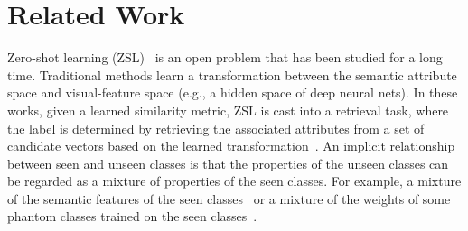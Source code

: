 \documentclass[letterpaper]{article} %
\begin{document}
\section{Related Work}
Zero-shot learning (ZSL)~\cite{Larochelle:2008:ZLN:1620163.1620172,lampert2013attribute,xian2018zero} is an open problem that has been studied for a long time.
Traditional methods learn a transformation between the semantic attribute space and visual-feature space (e.g., a hidden space of deep neural nets).  
In these works, given a learned similarity metric, ZSL is cast into a retrieval task, where the label is determined by retrieving the associated attributes from a 
set of candidate vectors based on the learned transformation~\cite{frome2013devise,akata2015label,akata2015evaluation,romera2015embarrassingly,kodirov2017semantic,xian2016latent,socher2013zero}.
An implicit relationship between seen and unseen classes is that the properties of the unseen classes can be regarded as a mixture of properties of the seen classes. For example, a mixture of the semantic features of the seen classes~\cite{norouzi2013zero} or a mixture of the weights of some phantom classes trained on the seen classes~\cite{changpinyo2016synthesized}. 

\end{document}
